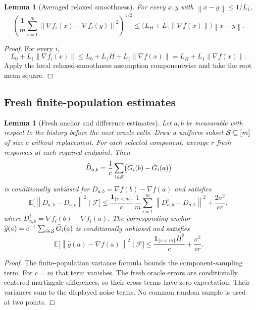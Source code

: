 \documentclass[11pt,a4paper]{article}
\newcommand{\E}{\mathbb{E}}
\newcommand{\norm}[1]{\left\lVert #1\right\rVert}
\newtheorem{lemma}[theorem]{Lemma}
\theoremstyle{remark}
\begin{document}
\begin{lemma}[Averaged relaxed smoothness]
\label{lem:averaged-relaxed}
For every $x,y$ with $\norm{x-y}\le1/L_1$,
\begin{equation}
 \left(
 \frac1m\sum_{i=1}^m
 \norm{\nabla f_i(x)-\nabla f_i(y)}^2
 \right)^{1/2}
 \le
 \bigl(L_H+L_1\norm{\nabla f(x)}\bigr)\norm{x-y}.
 \label{eq:averaged-relaxed}
\end{equation}
\end{lemma}

\begin{proof}
For every $i$,
\[
 L_0+L_1\norm{\nabla f_i(x)}
 \le L_0+L_1H+L_1\norm{\nabla f(x)}
 =L_H+L_1\norm{\nabla f(x)}.
\]
Apply the local relaxed-smoothness assumption componentwise and take the root
mean square.
\end{proof}

\subsection{Fresh finite-population estimates}

\begin{lemma}[Fresh anchor and difference estimates]
\label{lem:fresh-finite-pop}
Let $a,b$ be measurable with respect to the history before the next oracle
calls.  Draw a uniform subset ${\cal S}\subseteq[m]$ of size $c$ without
replacement.  For each selected component, average $r$ fresh responses at
each required endpoint.  Then
\[
 \widehat D_{a,b}=\frac1c\sum_{i\in{\cal S}}
       \bigl(\bar G_i(b)-\bar G_i(a)\bigr)
\]
is conditionally unbiased for $D_{a,b}=\nabla f(b)-\nabla f(a)$ and satisfies
\begin{equation}
 \E\bigl[\norm{\widehat D_{a,b}-D_{a,b}}^2\mid\mathcal F\bigr]
 \le \frac{\mathbf1_{\{c<m\}}}{c}\,
       \frac1m\sum_{i=1}^m\norm{D^i_{a,b}-D_{a,b}}^2
       +\frac{2\sigma^2}{cr},
 \label{eq:difference-primitive}
\end{equation}
where $D^i_{a,b}=\nabla f_i(b)-\nabla f_i(a)$.
The corresponding anchor $\widehat g(a)=c^{-1}\sum_{i\in{\cal S}}\bar G_i(a)$
is conditionally unbiased and satisfies
\begin{equation}
 \E\bigl[\norm{\widehat g(a)-\nabla f(a)}^2\mid\mathcal F\bigr]
 \le \frac{\mathbf1_{\{c<m\}}H^2}{c}+\frac{\sigma^2}{cr}.
 \label{eq:anchor-primitive}
\end{equation}
\end{lemma}

\begin{proof}
The finite-population variance formula bounds the component-sampling term.
For $c=m$ that term vanishes.  The fresh oracle errors are conditionally
centered martingale differences, so their cross terms have zero expectation.
Their variances sum to the displayed noise terms.  No common random sample is
used at two points.
\end{proof}
\end{document}
